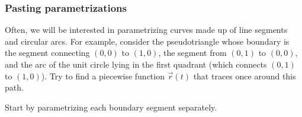 \documentclass[11pt,ignorenonframetext,aspectratio=169,xcolor={svgnames}]{beamer}
\begin{document}
\begin{frame}\frametitle{Pasting parametrizations}

Often, we will be interested in parametrizing curves made up of line
segments and circular arcs. For example, consider the pseudotriangle
whose boundary is the segment connecting $(0,0)$ to $(1,0)$, the segment
from $(0,1)$ to $(0,0)$, and the arc of the unit circle lying in the
first quadrant (which connects $(0,1)$ to $(1,0)$). Try to find a
piecewise function $\vec{r}(t)$ that traces once around this path.

Start by parametrizing each boundary segment separately.

\end{frame}
\end{document}
